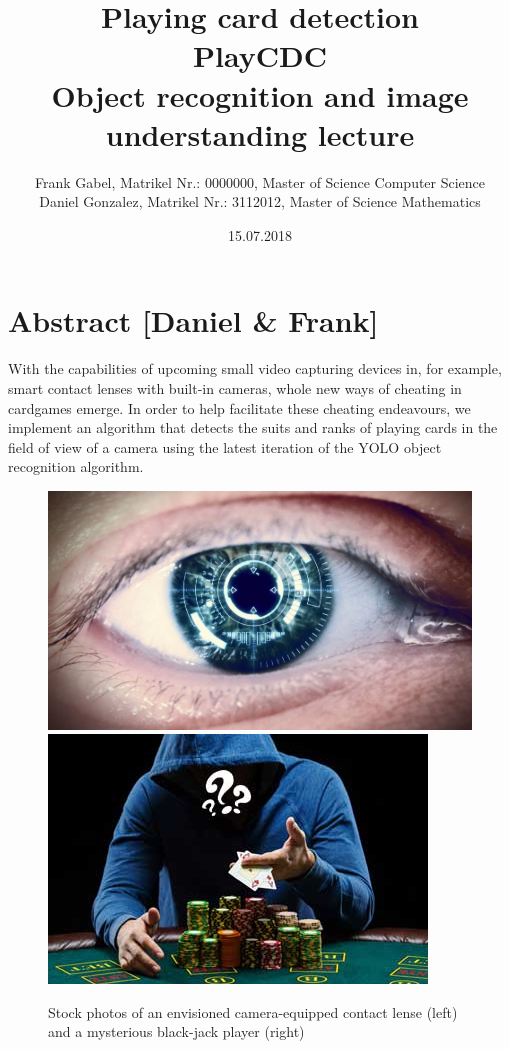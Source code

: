 \documentclass[a4paper]{article}
\title{\textbf{Playing card detection}\\ PlayCDC\\Object recognition and image understanding lecture}
\author{Frank Gabel, Matrikel Nr.: 0000000, Master of Science Computer Science \\ Daniel Gonzalez, Matrikel Nr.: 3112012, Master of Science Mathematics}
\date{15.07.2018}
\begin{document}
\maketitle
\section{Abstract [Daniel \& Frank]}
With the capabilities of upcoming small video capturing devices in, for example, smart contact lenses with built-in cameras, whole new ways of cheating in cardgames emerge. In order to help facilitate these cheating endeavours, we implement an algorithm that detects the suits and ranks of playing cards in the field of view of a camera using the latest iteration of the YOLO object recognition algorithm.
\begin{figure}[h]
\includegraphics[scale=0.25]{images/contact_lense}
\includegraphics[scale=0.532]{images/poker_player}
\caption{Stock photos of an envisioned camera-equipped contact lense (left) and a mysterious black-jack player (right)}
\end{figure}
\end{document}

